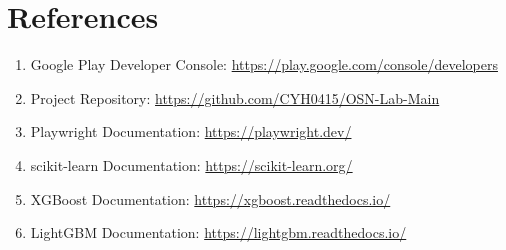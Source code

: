 \documentclass[11pt,a4paper]{article}
\begin{document}
\section{References}

\begin{enumerate}[leftmargin=2em]
  \item Google Play Developer Console: \url{https://play.google.com/console/developers}
  \item Project Repository: \url{https://github.com/CYH0415/OSN-Lab-Main}
  \item Playwright Documentation: \url{https://playwright.dev/}
  \item scikit-learn Documentation: \url{https://scikit-learn.org/}
  \item XGBoost Documentation: \url{https://xgboost.readthedocs.io/}
  \item LightGBM Documentation: \url{https://lightgbm.readthedocs.io/}
\end{enumerate}

\label{LastPage}
\end{document}
